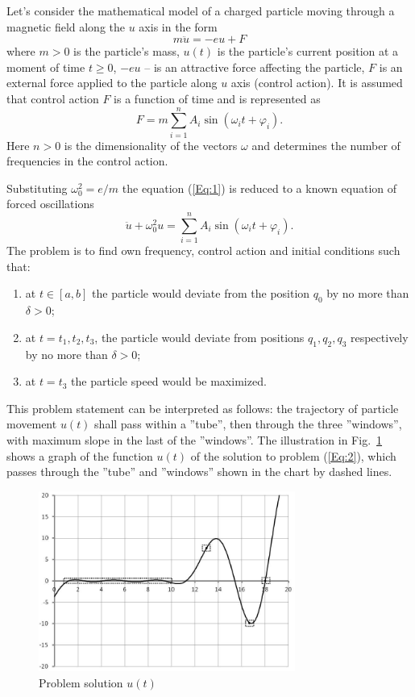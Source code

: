 \documentclass{llncs}
\begin{document}
Let's consider the mathematical model of a charged particle moving through a magnetic field along the $u$ axis in the form\begin{equation}\label{Eq:1}
m\ddot{u}=-eu+F	
\end{equation}
where $m>0$ is the particle’s mass, $u(t)$ is the particle's current position at a moment of time \mbox{$t\geq0$}, $-eu$ -- is an attractive force affecting the particle, $F$ is an external force applied to the particle along $u$ axis (control action). It is assumed that control action $F$ is a function of time and is represented as
\[ 
F=m\sum^{n}_{i=1}A_i\sin(\omega_it+\varphi_i).
\]
Here $n>0$ is the dimensionality of the vectors $\omega$ and determines the number of frequencies in the control action.

Substituting  $\omega^2_0=e/m$ the equation (\ref{Eq:1}) is reduced to a known equation of forced oscillations
\begin{equation}\label{Eq:2}
\ddot{u}+\omega^2_0u=\sum^{n}_{i=1}A_i\sin(\omega_it+\varphi_i).	
\end{equation}
The problem is to find own frequency, control action and initial conditions such that:
\begin{enumerate}
\item
at $t\in[a,b]$ the particle would deviate from the position $q_0$ by no more than $\delta>0$;
\item
at $t=t_1, t_2, t_3$, the particle would deviate from positions $q_1, q_2, q_3$ respectively by no more than $\delta>0$;
\item
at $t=t_3$ the particle speed would be maximized.
\end{enumerate}
This problem statement can be interpreted as follows: the trajectory of particle movement $u(t)$ shall pass within a ''tube'', then through the three ''windows'', with maximum slope in the last of the ''windows''. The illustration in Fig.~\ref{fig11} shows a graph of the function $u(t)$ of the solution to problem  (\ref{Eq:2}), which passes through the ''tube'' and ''windows'' shown in the chart by dashed lines.

\begin{figure}
\begin{center}
  \includegraphics[width=0.75\textwidth]{fig1.jpg} 
  \caption{Problem solution $u(t)$} \label{fig11} 
\end{center}
\end{figure}
\end{document}
